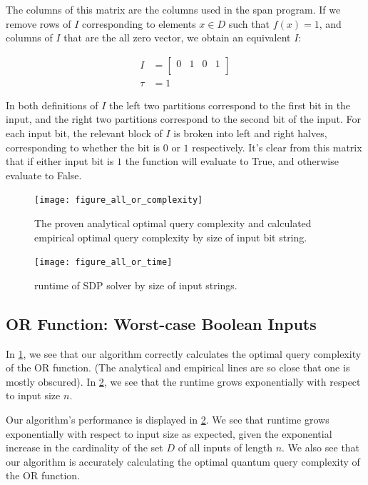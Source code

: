 The columns of this matrix are the columns used in the span program. If we remove rows of $I$ corresponding to elements $ x \in D$ such that $f(x) = 1$, and columns of $I$ that are the all zero vector, we obtain an equivalent $I$:

\begin{align}
I &= \left[\begin{array}{c|c|c|c}
   0 & 1 & 0 & 1 \\
\end{array} \right] \nonumber \\
\tau &= 1 \nonumber
\end{align}

In both definitions of $I$ the left two partitions correspond to the first bit in the
input, and the right two partitions correspond to the second bit of the input. For each
input bit, the relevant block of $I$ is broken into left and right halves, corresponding
to whether the bit is $0$ or $1$ respectively. It's clear from this matrix that if either input bit is $1$ the function will evaluate to True, and otherwise evaluate to False.

\begin{figure}[ht]
\centering
\texttt{[image: figure\_all\_or\_complexity]}
\caption{The proven analytical optimal query complexity
and calculated empirical optimal query complexity by 
size of input bit string.}
\label{fig:or_all_complexity}
\end{figure}

\begin{figure}[ht]
\centering
\texttt{[image: figure\_all\_or\_time]}
\caption{runtime of SDP solver by size of input strings.}
\label{fig:or_all_runtime}
\end{figure}

\subsection{OR Function: Worst-case Boolean Inputs}\label{sec:speed}
In \cref{fig:or_all_complexity}, we see that our algorithm
correctly calculates the optimal query complexity of the OR function.
(The analytical and empirical lines are so close that one
is mostly obscured).
In \cref{fig:or_all_runtime}, we see that the runtime grows
exponentially with respect to input size $n$.

Our algorithm's performance is displayed in \cref{fig:or_all_runtime}.
We see that runtime grows exponentially with respect to input size as expected, 
given the exponential increase in the cardinality of the set $D$ of all
inputs of length $n$. 
We also see that our algorithm is accurately calculating the
optimal quantum query complexity of the OR function. 

